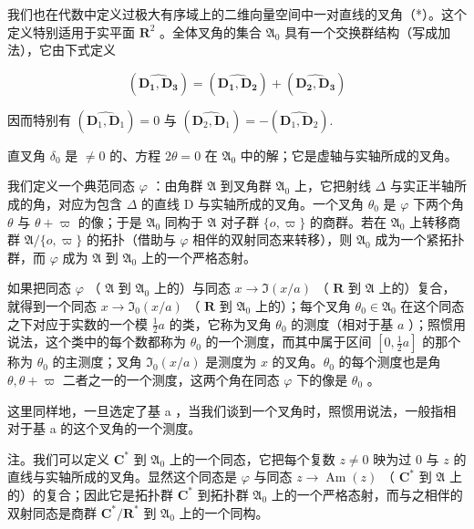 我们也在代数中定义过极大有序域上的二维向量空间中一对直线的叉角（*）。这个定义特别适用于实平面 \(\mathbf{R}^2\) 。全体叉角的集合 \(\mathfrak{A}_0\) 具有一个交换群结构（写成加法），它由下式定义

\[
(\widehat {\mathbf {D _ {1} , D _ {3}}}) = (\widehat {\mathbf {D _ {1} , D _ {2}}}) + (\widehat {\mathbf {D _ {2} , D _ {3}}})
\]

因而特别有 \((\widehat{\mathbf{D}_1,\mathbf{D}_1}) = 0\) 与 \((\widehat{\mathbf{D}_2,\mathbf{D}_1}) = -(\widehat{\mathbf{D}_1,\mathbf{D}_2}).\)

直叉角 \(\delta_0\) 是 \(\neq 0\) 的、方程 \(2\theta = 0\) 在 \(\mathfrak{A}_0\) 中的解；它是虚轴与实轴所成的叉角。

我们定义一个典范同态 \(\varphi\) ：由角群 \(\mathfrak{A}\) 到叉角群 \(\mathfrak{A}_0\) 上，它把射线 \(\Delta\) 与实正半轴所成的角，对应为包含 \(\Delta\) 的直线 D 与实轴所成的叉角。一个叉角 \(\theta_0\) 是 \(\varphi\) 下两个角 \(\theta\) 与 \(\theta + \varpi\) 的像；于是 \(\mathfrak{A}_0\) 同构于 \(\mathfrak{A}\) 对子群 \(\{o, \varpi\}\) 的商群。若在 \(\mathfrak{A}_0\) 上转移商群 \(\mathfrak{A}/\{o, \varpi\}\) 的拓扑（借助与 \(\varphi\) 相伴的双射同态来转移），则 \(\mathfrak{A}_0\) 成为一个紧拓扑群，而 \(\varphi\) 成为 \(\mathfrak{A}\) 到 \(\mathfrak{A}_0\) 上的一个严格态射。

如果把同态 \(\varphi\) （ \(\mathfrak{A}\) 到 \(\mathfrak{A}_0\) 上的）与同态 \(x \to \Im(x/a)\) （ \(\mathbf{R}\) 到 \(\mathfrak{A}\) 上的）复合，就得到一个同态 \(x \to \Im_0(x/a)\) （ \(\mathbf{R}\) 到 \(\mathfrak{A}_0\) 上的）；每个叉角 \(\theta_0 \in \mathfrak{A}_0\) 在这个同态之下对应于实数的一个模 \(\frac{1}{2}a\) 的类，它称为叉角 \(\theta_0\) 的测度（相对于基 \(a\) ）；照惯用说法，这个类中的每个数都称为 \(\theta_0\) 的一个测度，而其中属于区间 \([0, \frac{1}{2}a]\) 的那个称为 \(\theta_0\) 的主测度；叉角 \(\Im_0(x/a)\) 是测度为 \(x\) 的叉角。\(\theta_0\) 的每个测度也是角 \(\theta, \theta + \varpi\) 二者之一的一个测度，这两个角在同态 \(\varphi\) 下的像是 \(\theta_0\) 。

这里同样地，一旦选定了基 a ，当我们谈到一个叉角时，照惯用说法，一般指相对于基 a 的这个叉角的一个测度。

注。我们可以定义 \(\mathbf{C}^*\) 到 \(\mathfrak{A}_0\) 上的一个同态，它把每个复数 \(z \neq 0\) 映为过 \(0\) 与 \(z\) 的直线与实轴所成的叉角。显然这个同态是 \(\varphi\) 与同态 \(z \to \operatorname{Am}(z)\) （ \(\mathbf{C}^*\) 到 \(\mathfrak{A}\) 上的）的复合；因此它是拓扑群 \(\mathbf{C}^*\) 到拓扑群 \(\mathfrak{A}_0\) 上的一个严格态射，而与之相伴的双射同态是商群 \(\mathbf{C}^*/\mathbf{R}^*\) 到 \(\mathfrak{A}_0\) 上的一个同构。

